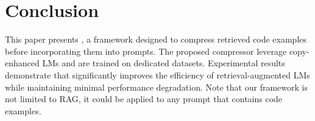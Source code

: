 \section{Conclusion}\label{sec:dis}
This paper presents \ourtool, a framework designed to compress retrieved code examples before incorporating them into prompts. The proposed compressor leverage copy-enhanced LMs and are trained on dedicated datasets. Experimental results demonstrate that \ourtool significantly improves the efficiency of retrieval-augmented LMs while maintaining minimal performance degradation. Note that our framework is not limited to RAG, it could be applied to any prompt that contains code examples. 